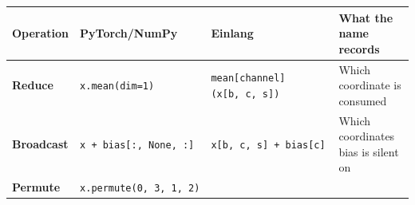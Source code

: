 \documentclass[11pt,titlepage]{article}
\begin{document}
\begin{longtable}[]{@{}llll@{}}
\toprule
\begin{minipage}[b]{0.22\columnwidth}\raggedright
Operation\strut
\end{minipage} & \begin{minipage}[b]{0.22\columnwidth}\raggedright
PyTorch/NumPy\strut
\end{minipage} & \begin{minipage}[b]{0.22\columnwidth}\raggedright
Einlang\strut
\end{minipage} & \begin{minipage}[b]{0.22\columnwidth}\raggedright
What the name records\strut
\end{minipage}\tabularnewline
\midrule
\endhead
\begin{minipage}[t]{0.22\columnwidth}\raggedright
\textbf{Reduce}\strut
\end{minipage} & \begin{minipage}[t]{0.22\columnwidth}\raggedright
\texttt{x.mean(dim=1)}\strut
\end{minipage} & \begin{minipage}[t]{0.22\columnwidth}\raggedright
\texttt{mean{[}channel{]}(x{[}b,\ c,\ s{]})}\strut
\end{minipage} & \begin{minipage}[t]{0.22\columnwidth}\raggedright
Which coordinate is consumed\strut
\end{minipage}\tabularnewline
\begin{minipage}[t]{0.22\columnwidth}\raggedright
\textbf{Broadcast}\strut
\end{minipage} & \begin{minipage}[t]{0.22\columnwidth}\raggedright
\texttt{x\ +\ bias{[}:,\ None,\ :{]}}\strut
\end{minipage} & \begin{minipage}[t]{0.22\columnwidth}\raggedright
\texttt{x{[}b,\ c,\ s{]}\ +\ bias{[}c{]}}\strut
\end{minipage} & \begin{minipage}[t]{0.22\columnwidth}\raggedright
Which coordinates bias is silent on\strut
\end{minipage}\tabularnewline
\begin{minipage}[t]{0.22\columnwidth}\raggedright
\textbf{Permute}\strut
\end{minipage} & \begin{minipage}[t]{0.22\columnwidth}\raggedright
\texttt{x.permute(0,\ 3,\ 1,\ 2)}\strut
\end{minipage} & \begin{minipage}[t]{0.22\columnwidth}\raggedright

\end{minipage}
\end{longtable}
\end{document}
